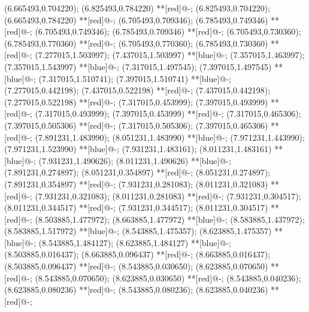 (6.665493,0.704220); (6.825493,0.784220) **[red]@{-};
(6.825493,0.704220); (6.665493,0.784220) **[red]@{-};
(6.705493,0.709346); (6.785493,0.749346) **[red]@{-};
(6.705493,0.749346); (6.785493,0.709346) **[red]@{-};
(6.705493,0.730360); (6.785493,0.770360) **[red]@{-};
(6.705493,0.770360); (6.785493,0.730360) **[red]@{-};
(7.277015,1.503997); (7.437015,1.503997) **[blue]@{-};
(7.357015,1.463997); (7.357015,1.543997) **[blue]@{-};
(7.317015,1.497545); (7.397015,1.497545) **[blue]@{-};
(7.317015,1.510741); (7.397015,1.510741) **[blue]@{-};
(7.277015,0.442198); (7.437015,0.522198) **[red]@{-};
(7.437015,0.442198); (7.277015,0.522198) **[red]@{-};
(7.317015,0.453999); (7.397015,0.493999) **[red]@{-};
(7.317015,0.493999); (7.397015,0.453999) **[red]@{-};
(7.317015,0.465306); (7.397015,0.505306) **[red]@{-};
(7.317015,0.505306); (7.397015,0.465306) **[red]@{-};
(7.891231,1.483990); (8.051231,1.483990) **[blue]@{-};
(7.971231,1.443990); (7.971231,1.523990) **[blue]@{-};
(7.931231,1.483161); (8.011231,1.483161) **[blue]@{-};
(7.931231,1.490626); (8.011231,1.490626) **[blue]@{-};
(7.891231,0.274897); (8.051231,0.354897) **[red]@{-};
(8.051231,0.274897); (7.891231,0.354897) **[red]@{-};
(7.931231,0.281083); (8.011231,0.321083) **[red]@{-};
(7.931231,0.321083); (8.011231,0.281083) **[red]@{-};
(7.931231,0.304517); (8.011231,0.344517) **[red]@{-};
(7.931231,0.344517); (8.011231,0.304517) **[red]@{-};
(8.503885,1.477972); (8.663885,1.477972) **[blue]@{-};
(8.583885,1.437972); (8.583885,1.517972) **[blue]@{-};
(8.543885,1.475357); (8.623885,1.475357) **[blue]@{-};
(8.543885,1.484127); (8.623885,1.484127) **[blue]@{-};
(8.503885,0.016437); (8.663885,0.096437) **[red]@{-};
(8.663885,0.016437); (8.503885,0.096437) **[red]@{-};
(8.543885,0.030650); (8.623885,0.070650) **[red]@{-};
(8.543885,0.070650); (8.623885,0.030650) **[red]@{-};
(8.543885,0.040236); (8.623885,0.080236) **[red]@{-};
(8.543885,0.080236); (8.623885,0.040236) **[red]@{-};
\endxy
